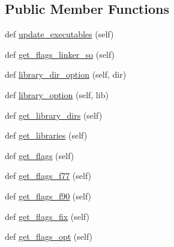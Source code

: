 \subsection*{Public Member Functions}
\begin{DoxyCompactItemize}
\item 
def \hyperlink{classnumpy_1_1distutils_1_1fcompiler_1_1absoft_1_1AbsoftFCompiler_aa1856c0069f02c699f5484d0fc6dfacc}{update\+\_\+executables} (self)
\item 
def \hyperlink{classnumpy_1_1distutils_1_1fcompiler_1_1absoft_1_1AbsoftFCompiler_a572514696a46e51266d99fbb3649cf19}{get\+\_\+flags\+\_\+linker\+\_\+so} (self)
\item 
def \hyperlink{classnumpy_1_1distutils_1_1fcompiler_1_1absoft_1_1AbsoftFCompiler_af7dcba236d0cf8a2cc1ce7c70ac7be48}{library\+\_\+dir\+\_\+option} (self, dir)
\item 
def \hyperlink{classnumpy_1_1distutils_1_1fcompiler_1_1absoft_1_1AbsoftFCompiler_add374459714542e7ee0436224ce62c64}{library\+\_\+option} (self, lib)
\item 
def \hyperlink{classnumpy_1_1distutils_1_1fcompiler_1_1absoft_1_1AbsoftFCompiler_ad8647bd68207b0eaf5b942b286e3ea76}{get\+\_\+library\+\_\+dirs} (self)
\item 
def \hyperlink{classnumpy_1_1distutils_1_1fcompiler_1_1absoft_1_1AbsoftFCompiler_ae6b0429690c7371b414e1dc66162a2fb}{get\+\_\+libraries} (self)
\item 
def \hyperlink{classnumpy_1_1distutils_1_1fcompiler_1_1absoft_1_1AbsoftFCompiler_a57ed84ab79e2fa2cc0a105b36f3947e8}{get\+\_\+flags} (self)
\item 
def \hyperlink{classnumpy_1_1distutils_1_1fcompiler_1_1absoft_1_1AbsoftFCompiler_a1f5ca630be5dd6a25f0965bb9511245b}{get\+\_\+flags\+\_\+f77} (self)
\item 
def \hyperlink{classnumpy_1_1distutils_1_1fcompiler_1_1absoft_1_1AbsoftFCompiler_af6178295f3d4cd7827f138f48d947113}{get\+\_\+flags\+\_\+f90} (self)
\item 
def \hyperlink{classnumpy_1_1distutils_1_1fcompiler_1_1absoft_1_1AbsoftFCompiler_a52c90ef40c87d53356b1cd7e318003ba}{get\+\_\+flags\+\_\+fix} (self)
\item 
def \hyperlink{classnumpy_1_1distutils_1_1fcompiler_1_1absoft_1_1AbsoftFCompiler_ab43e59c6d1e235f5995e7779f730a005}{get\+\_\+flags\+\_\+opt} (self)
\end{DoxyCompactItemize}
